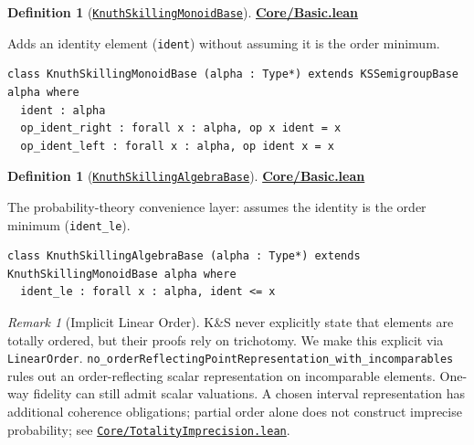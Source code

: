 \documentclass[11pt]{article}
\theoremstyle{definition}
\newtheorem{definition}[theorem]{Definition}
\theoremstyle{remark}
\newtheorem{remark}[theorem]{Remark}
\begin{document}
\begin{definition}[\href{https://github.com/zariuq/ks-foundations-of-inference/blob/main/KnuthSkilling/Core/Basic.lean}{\texttt{KnuthSkillingMonoidBase}}]
\textbf{\href{https://github.com/zariuq/ks-foundations-of-inference/blob/main/KnuthSkilling/Core/Basic.lean}{Core/Basic.lean}}

Adds an identity element (\texttt{ident}) without assuming it is the order minimum.
\end{definition}

\begin{lstlisting}[caption={Core K\&S structure with identity (no positivity assumption)}]
class KnuthSkillingMonoidBase (alpha : Type*) extends KSSemigroupBase alpha where
  ident : alpha
  op_ident_right : forall x : alpha, op x ident = x
  op_ident_left : forall x : alpha, op ident x = x
\end{lstlisting}

\begin{definition}[\href{https://github.com/zariuq/ks-foundations-of-inference/blob/main/KnuthSkilling/Core/Basic.lean}{\texttt{KnuthSkillingAlgebraBase}}]
\textbf{\href{https://github.com/zariuq/ks-foundations-of-inference/blob/main/KnuthSkilling/Core/Basic.lean}{Core/Basic.lean}}

The probability-theory convenience layer: assumes the identity is the order minimum (\texttt{ident\_le}).
\end{definition}

\begin{lstlisting}[caption={K\&S probability base: identity is minimum (positivity)}]
class KnuthSkillingAlgebraBase (alpha : Type*) extends KnuthSkillingMonoidBase alpha where
  ident_le : forall x : alpha, ident <= x
\end{lstlisting}

\begin{remark}[Implicit Linear Order]
K\&S never explicitly state that elements are totally ordered, but their proofs rely on trichotomy.
We make this explicit via \texttt{LinearOrder}.
\texttt{no\_orderReflectingPointRepresentation\_with\_incomparables} rules out an
order-reflecting scalar representation on incomparable elements. One-way fidelity
can still admit scalar valuations. A chosen interval representation has additional
coherence obligations; partial order alone does not construct imprecise probability;
see \href{https://github.com/zariuq/ks-foundations-of-inference/blob/main/KnuthSkilling/Core/TotalityImprecision.lean}{\texttt{Core/TotalityImprecision.lean}}.
\end{remark}
\end{document}
